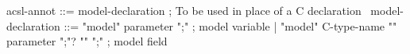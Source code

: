\begin{syntax}
  acsl-annot ::= model-declaration ; To be used in place of a C declaration
  \
  model-declaration ::= { "model" parameter ";" } ; model variable
  | "model" C-type-name "{" parameter ";"? "}" ";" ; model field 
\end{syntax}

